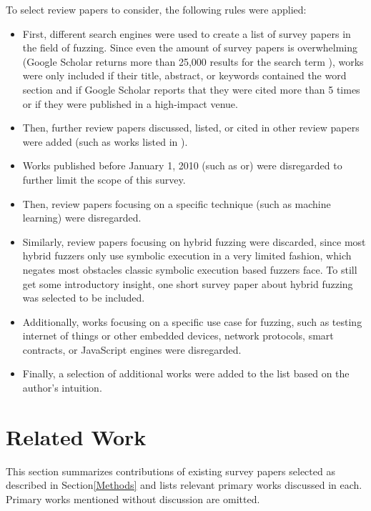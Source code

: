 \documentclass{article}
\begin{document}
\begin{multicols}{2}
  To select review papers to consider, the following rules were applied:
  \begin{itemize}
    \item First, different search engines were used to create a list of survey papers in the field of fuzzing. Since even the amount of survey papers is overwhelming (Google Scholar\cite{GoogleScholar} returns more than 25,000 results for the search term ), works were only included if their title, abstract, or keywords contained the word section  and if Google Scholar\cite{GoogleScholar} reports that they were cited more than 5 times or if they were published in a high-impact venue.
    \item Then, further review papers discussed, listed, or cited in other review papers were added (such as works listed in \cite{Demystifying}).
    \item Works published before January 1, 2010 (such as\cite{ViolatingAssumptionsWithFuzzing} or\cite{NewTrendsSymbex}) were disregarded to further limit the scope of this survey.
    \item Then, review papers focusing on a specific technique (such as machine learning\cite{ML1, ML2}) were disregarded.
    \item Similarly, review papers focusing on hybrid fuzzing\cite{Hybrid, Exploratory} were discarded, since most hybrid fuzzers only use symbolic execution in a very limited fashion, which negates most obstacles classic symbolic execution based fuzzers face. To still get some introductory insight, one short survey paper about hybrid fuzzing\cite{SurveyHybrid} was selected to be included.
    \item Additionally, works focusing on a specific use case for fuzzing, such as testing internet of things or other embedded devices\cite{IoT, Embedded, Embedded2}, network protocols\cite{Network, Network2023}, smart contracts\cite{Ethereum}, or JavaScript engines\cite{JavaScript, JavaScript2} were disregarded.
    \item Finally, a selection of additional works were added to the list based on the author's intuition.
  \end{itemize}

  \section{Related Work}
  \label{SurveyPapers}

  This section summarizes contributions of existing survey papers selected as described in Section\ref{Methods} and lists relevant primary works discussed in each. Primary works mentioned without discussion are omitted.


\end{multicols}
\end{document}
